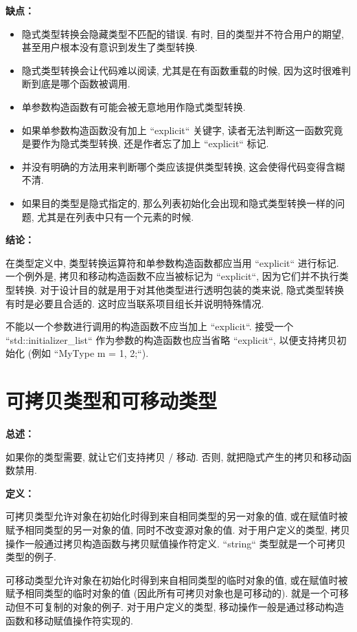 \textbf{缺点：}

\begin{itemize}
  \item 隐式类型转换会隐藏类型不匹配的错误. 有时, 目的类型并不符合用户的期望, 甚至用户根本没有意识到发生了类型转换.
  \item 隐式类型转换会让代码难以阅读, 尤其是在有函数重载的时候, 因为这时很难判断到底是哪个函数被调用.
  \item 单参数构造函数有可能会被无意地用作隐式类型转换.
  \item 如果单参数构造函数没有加上 ``explicit`` 关键字, 读者无法判断这一函数究竟是要作为隐式类型转换, 还是作者忘了加上 ``explicit`` 标记.
  \item 并没有明确的方法用来判断哪个类应该提供类型转换, 这会使得代码变得含糊不清.
  \item 如果目的类型是隐式指定的, 那么列表初始化会出现和隐式类型转换一样的问题, 尤其是在列表中只有一个元素的时候.
\end{itemize}

\textbf{结论：}

在类型定义中, 类型转换运算符和单参数构造函数都应当用 ``explicit`` 进行标记. 一个例外是, 拷贝和移动构造函数不应当被标记为 ``explicit``, 因为它们并不执行类型转换. 对于设计目的就是用于对其他类型进行透明包装的类来说, 隐式类型转换有时是必要且合适的. 这时应当联系项目组长并说明特殊情况.

不能以一个参数进行调用的构造函数不应当加上 ``explicit``. 接受一个 ``std::initializer\_list`` 作为参数的构造函数也应当省略 ``explicit``, 以便支持拷贝初始化 (例如 ``MyType m = {1, 2};``).

\section{可拷贝类型和可移动类型} \label{copyable-and-movable-types}

\textbf{总述：}

如果你的类型需要, 就让它们支持拷贝 / 移动. 否则, 就把隐式产生的拷贝和移动函数禁用.

\textbf{定义：}

可拷贝类型允许对象在初始化时得到来自相同类型的另一对象的值, 或在赋值时被赋予相同类型的另一对象的值, 同时不改变源对象的值. 对于用户定义的类型, 拷贝操作一般通过拷贝构造函数与拷贝赋值操作符定义. ``string`` 类型就是一个可拷贝类型的例子.

可移动类型允许对象在初始化时得到来自相同类型的临时对象的值, 或在赋值时被赋予相同类型的临时对象的值 (因此所有可拷贝对象也是可移动的).  就是一个可移动但不可复制的对象的例子. 对于用户定义的类型, 移动操作一般是通过移动构造函数和移动赋值操作符实现的.

